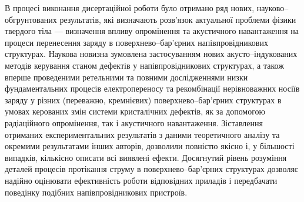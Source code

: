 {\noveltyTXT}
В процесі виконання дисертаційної роботи було отримано ряд нових, науково--обгрунтованих
результатів, які
визначають розв'язок актуальної проблеми фізики твердого тіла ---
визначення впливу опромінення та акустичного навантаження на процеси перенесення заряду в поверхнево--бар'єрних напівпровідникових структурах.
Наукова новизна зумовлена застосуванням нових акусто--індукованих методів керування станом дефектів у напівпровідникових структурах, а також вперше проведеними ретельними та повними дослідженнями низки фундаментальних процесів електропереносу та рекомбінації нерівноважних носіїв заряду у різних (переважно, кремнієвих) поверхнево--бар'єрних структурах в умовах керованих змін системи кристалічних дефектів, як за допомогою радіаційного опромінення, так і акустичного навантаження.
Зіставлення отриманих експериментальних результатів з даними теоретичного аналізу та окремими результатами інших авторів, дозволили повністю якісно і, у більшості випадків, кількісно описати всі виявлені ефекти.
Досягнутий рівень розуміння деталей процесів протікання струму в поверхнево--бар'єрних структурах дозволяє надійно оцінювати ефективність роботи відповідних приладів і передбачати поведінку подібних напівпровідникових пристроїв.
